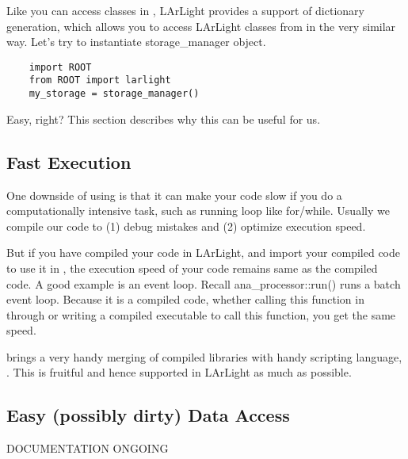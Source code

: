 Like you can access \ROOT classes in \python, LArLight provides a support of
\CINT dictionary generation, which allows you to access LArLight classes from
\python in the very similar way. Let's try to instantiate {\ttfamily storage\_manager} object.
\begin{lstlisting}
    import ROOT
    from ROOT import larlight
    my_storage = storage_manager()
\end{lstlisting}
Easy, right? This section describes why this can be useful for us.

\subsection{Fast Execution}
One downside of using \python is that it can make your code slow if you do a computationally
intensive task, such as running loop like {\ttfamily for}/{\ttfamily while}. Usually we
compile our \CPP code to (1) debug mistakes and (2) optimize execution speed.

But if you have compiled your \CPP code in LArLight, and import your compiled code to use it
in \python, the execution speed of your code remains same as the compiled code. A good example
is an event loop. Recall {\ttfamily ana\_processor::run()} runs a batch event loop. Because
it is a compiled code, whether calling this function in \python through \PyROOT or writing
a \CPP compiled executable to call this function, you get the same speed. 

\PyROOT brings a very handy merging of compiled \CPP libraries with handy scripting language, 
\python. This is fruitful and hence supported in LArLight as much as possible.

\subsection{Easy (possibly dirty) Data Access}
DOCUMENTATION ONGOING
